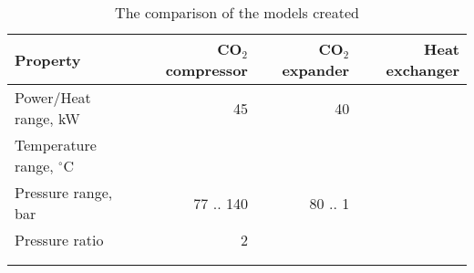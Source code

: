 \begin{table}
\label{tab:DiscussionComparison}
\caption{The comparison of the models created}
\begin{center}
\begin{tabulary}{0.9\textwidth}{LRRR}
\toprule
Property    	                &	CO$_2$ compressor   & CO$_2$	expander    & Heat exchanger    \\
\midrule
Power/Heat range, kW            &       45              &       40              &                   \\
Temperature range, $^\circ$C    &                       &                       &                   \\
Pressure range, bar             &   77 .. 140           &     80 .. 1           &                   \\
Pressure ratio                  &   2                   &                       &                   \\
& & & \\
& & & \\
\bottomrule
\end{tabulary}
\end{center}
\end{table}